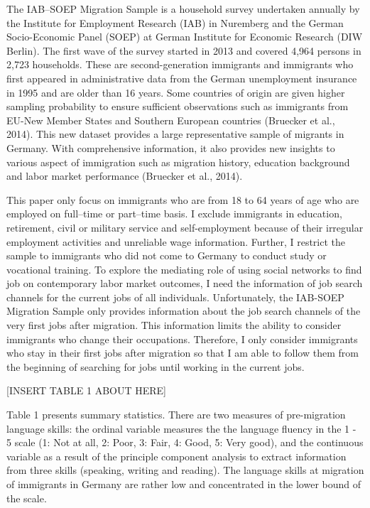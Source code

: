 \documentclass[12pt,a4paper]{article}
\begin{document}
The IAB--SOEP Migration Sample is a household survey undertaken annually by the Institute for Employment Research (IAB) in Nuremberg and the German Socio-Economic Panel (SOEP) at German Institute for Economic Research (DIW Berlin). The first wave of the survey started in 2013 and covered 4,964 persons in 2,723 households. These are second-generation immigrants and immigrants who first appeared in administrative data from the German unemployment insurance in 1995 and are older than 16 years. Some countries of origin are given higher sampling probability to ensure sufficient observations such as immigrants from EU-New Member States and Southern European countries (Bruecker et al., 2014). This new dataset provides a large representative sample of migrants in Germany. With comprehensive information, it also provides new insights to various aspect of immigration such as migration history, education background and labor market performance (Bruecker et al., 2014).

This paper only focus on immigrants who are from 18 to 64 years of age who are employed on full--time or part--time basis. I exclude immigrants in education, retirement, civil or military service and self-employment because of their irregular employment activities and unreliable wage information. Further, I restrict the sample to immigrants who did not come to Germany to conduct study or vocational training. To explore the mediating role of using social networks to find job on contemporary labor market outcomes, I need the information of job search channels for the current jobs of all individuals. Unfortunately, the IAB-SOEP Migration Sample only provides information about the job search channels of the very first jobs after migration. This information limits the ability to consider immigrants who change their occupations. Therefore, I only consider immigrants who stay in their first jobs after migration so that I am able to follow them from the beginning of searching for jobs until working in the current jobs.

\begin{center}
[INSERT TABLE 1 ABOUT HERE]
\end{center}

Table 1 presents summary statistics. There are two measures of pre-migration language skills: the ordinal variable measures the the language fluency in the 1 - 5 scale (1: Not at all, 2: Poor, 3: Fair, 4: Good, 5: Very good), and the continuous variable as a result of the principle component analysis to extract information from three skills (speaking, writing and reading). The language skills at migration of immigrants in Germany are rather low and concentrated in the lower bound of the scale.
\end{document}
